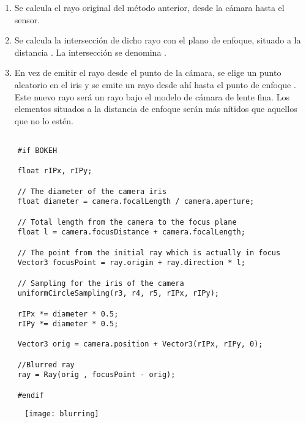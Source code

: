 \begin{enumerate}
		
\item Se calcula el rayo original del método anterior, desde la cámara hasta el sensor.

\item Se calcula la intersección de dicho rayo con el plano de enfoque, situado a la distancia . La intersección se denomina .
	
\item En vez de emitir el rayo desde el punto de la cámara, se elige un punto aleatorio en el iris  y se emite un rayo desde ahí hasta el punto de enfoque . Este nuevo rayo será un rayo bajo el modelo de cámara de lente fina. Los elementos situados a la distancia de enfoque  serán más nítidos que aquellos que no lo estén.
	
\end{enumerate}

\begin{minipage}[c]{0.95\textwidth}
\begin{lstlisting}
	
	#if BOKEH
	
    float rIPx, rIPy;

    // The diameter of the camera iris
    float diameter = camera.focalLength / camera.aperture;

    // Total length from the camera to the focus plane
    float l = camera.focusDistance + camera.focalLength;

    // The point from the initial ray which is actually in focus
    Vector3 focusPoint = ray.origin + ray.direction * l;

    // Sampling for the iris of the camera
    uniformCircleSampling(r3, r4, r5, rIPx, rIPy);

    rIPx *= diameter * 0.5;
    rIPy *= diameter * 0.5;

    Vector3 orig = camera.position + Vector3(rIPx, rIPy, 0);

    //Blurred ray
    ray = Ray(orig , focusPoint - orig);

	#endif 

\end{lstlisting}
\end{minipage}

\begin{figure}[H]
	\centering
	\texttt{[image: blurring]}
	\caption{}
	\label{fig:label}
\end{figure}

